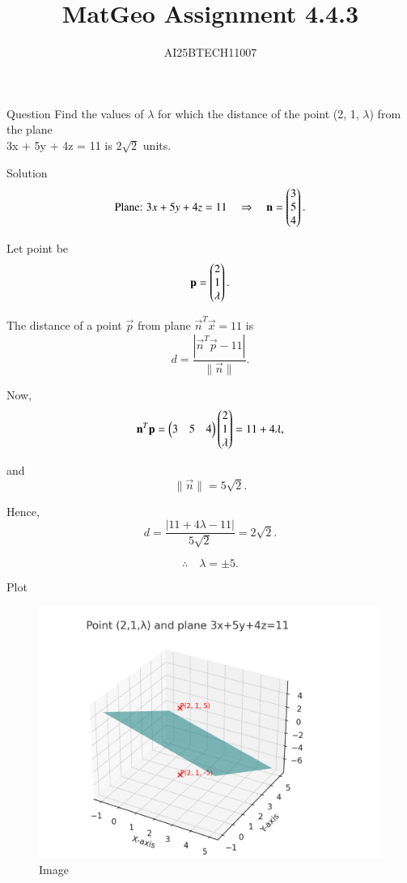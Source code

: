 \documentclass{beamer}
\title 
{MatGeo Assignment 4.4.3}
\author
{AI25BTECH11007}
\begin{document}
\frame{\titlepage}
\begin{frame}{Question}
Find the values of $\lambda$ for which the distance of the point (2, 1, $\lambda$) from the plane\\
3x + 5y + 4z = 11 is $2\sqrt{2}$ units.
\end{frame}

\begin{frame}{Solution}
\[
\text{Plane: } 3x+5y+4z=11 
\quad\Rightarrow\quad 
\mathbf{n}=\begin{pmatrix}3\\5\\4\end{pmatrix}.
\]

Let point be 
\[
\mathbf{p}=\begin{pmatrix}2\\1\\\lambda\end{pmatrix}.
\]

The distance of a point \(\vec p\) from plane \(\vec n^T\vec x=11\) is
\begin{equation}
d=\frac{|\vec n^T\vec p-11|}{\|\vec n\|}.
\end{equation}

Now,
\begin{equation}
\mathbf {n}^T\mathbf {p}
= \begin{pmatrix}3 & 5 & 4\end{pmatrix}\begin{pmatrix}2\\1\\\lambda\end{pmatrix} 
= 11+4\lambda,
\end{equation}
    
\end{frame}
\begin{frame}
and
\begin{equation}
\|\vec n\|
= 5\sqrt{2}.
\end{equation}

Hence,
\begin{equation}
d=\frac{|11+4\lambda-11|}{5\sqrt{2}} = 2\sqrt{2}.
\end{equation}

\begin{equation}
\therefore \quad \lambda=\pm 5.
\end{equation}
\end{frame}

\begin{frame}{Plot}
\begin{figure}
    \centering
    \includegraphics[width=0.90\linewidth]{figs/image.png}
    \caption{Image}
    \label{fig:placeholder}
\end{figure}
\end{frame}
\end{document}
